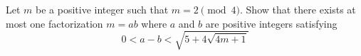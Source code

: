 Let $m$ be a positive integer such that $m=2\pmod{4}$. Show that there exists at most one factorization $m=ab$ where $a$ and $b$ are positive integers satisfying\[0<a-b<\sqrt{5+4\sqrt{4m+1}}\]